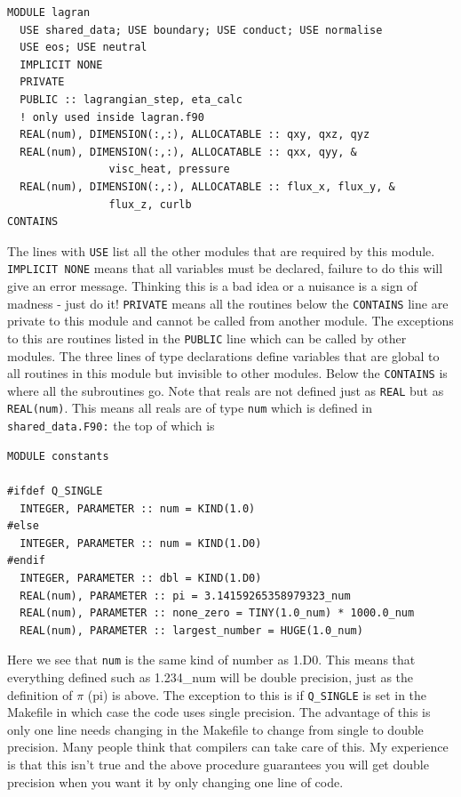 \documentclass[11pt]{article}
\begin{document}
\begin{verbatim}
MODULE lagran
  USE shared_data; USE boundary; USE conduct; USE normalise
  USE eos; USE neutral
  IMPLICIT NONE
  PRIVATE
  PUBLIC :: lagrangian_step, eta_calc
  ! only used inside lagran.f90
  REAL(num), DIMENSION(:,:), ALLOCATABLE :: qxy, qxz, qyz
  REAL(num), DIMENSION(:,:), ALLOCATABLE :: qxx, qyy, &
                visc_heat, pressure
  REAL(num), DIMENSION(:,:), ALLOCATABLE :: flux_x, flux_y, &
                flux_z, curlb
CONTAINS
\end{verbatim}
The lines with \texttt{USE} list all the other modules that are required by this module. \texttt{IMPLICIT NONE} means that all variables must be declared, failure to do this will give an error message. Thinking this is a bad idea or a nuisance is a sign of madness - just do it! \texttt{PRIVATE} means all the routines below the \texttt{CONTAINS} line are private to this module and cannot be called from another module. The exceptions to this are routines listed in the \texttt{PUBLIC} line which can be called by other modules. The three lines of type declarations define variables that are global to all routines in this module but invisible to other modules. Below the \texttt{CONTAINS} is where all the subroutines go. Note that reals are not defined just as \texttt{REAL} but as \texttt{REAL(num)}. This means all reals are of type \texttt{num} which is defined in {\texttt{shared\_data.F90:}} the top of which is
\begin{verbatim}
MODULE constants

#ifdef Q_SINGLE
  INTEGER, PARAMETER :: num = KIND(1.0) 
#else
  INTEGER, PARAMETER :: num = KIND(1.D0) 
#endif
  INTEGER, PARAMETER :: dbl = KIND(1.D0)
  REAL(num), PARAMETER :: pi = 3.14159265358979323_num
  REAL(num), PARAMETER :: none_zero = TINY(1.0_num) * 1000.0_num
  REAL(num), PARAMETER :: largest_number = HUGE(1.0_num)
\end{verbatim}
Here we see that \texttt{num} is the same kind of number as 1.D0. This means that everything defined such as 1.234\_num will be double precision, just as the definition of $\pi$ (pi) is above. The exception to this is if \texttt{Q\_SINGLE} is set in the Makefile in which case the code uses single precision. The advantage of this is only one line needs changing in the Makefile to change from single to double precision. Many people think that compilers can take care of this. My experience is that this isn't true and the above procedure guarantees you will get double precision when you want it by only changing one line of code.
\end{document}
